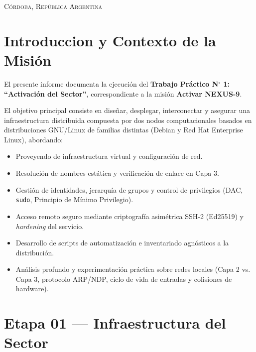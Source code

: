 \documentclass[11pt,a4paper]{article}
\begin{document}
\begin{titlepage}
    \vfill
    \vspace{0.5cm}
    {\footnotesize\scshape Córdoba, República Argentina}
\end{titlepage}

\hypersetup{pageanchor=true}

\setcounter{section}{-1}
\section{Introduccion y Contexto de la Misión}
El presente informe documenta la ejecución del \textbf{Trabajo Práctico N$^\circ$ 1: “Activación del Sector”}, correspondiente a la misión  \textbf{Activar NEXUS-9}.

El objetivo principal consiste en diseñar, desplegar, interconectar y asegurar una infraestructura distribuida compuesta por dos nodos computacionales basados en distribuciones GNU/Linux de familias distintas (Debian y Red Hat Enterprise Linux), abordando:
\begin{itemize}[leftmargin=1cm]
    \item Proveyendo de infraestructura virtual y configuración de red.
    \item Resolución de nombres estática y verificación de enlace en Capa 3.
    \item Gestión de identidades, jerarquía de grupos y control de privilegios (DAC, \texttt{sudo}, Principio de Mínimo Privilegio).
    \item Acceso remoto seguro mediante criptografía asimétrica SSH-2 (Ed25519) y \textit{hardening} del servicio.
    \item Desarrollo de scripts de automatización e inventariado agnósticos a la distribución.
    \item Análisis profundo y experimentación práctica sobre redes locales (Capa 2 vs. Capa 3, protocolo ARP/NDP, ciclo de vida de entradas y colisiones de hardware).
\end{itemize}

\section{Etapa 01 — Infraestructura del Sector}
\end{document}
